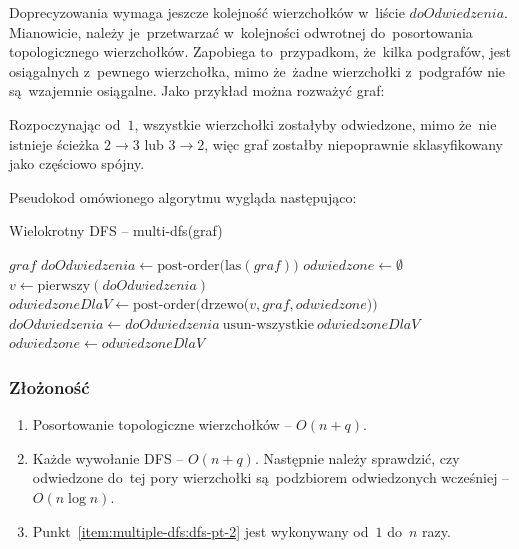 \documentclass[a4paper,12pt]{mwart}
\begin{document}
Doprecyzowania wymaga jeszcze kolejność wierzchołków w~liście $doOdwiedzenia$.
Mianowicie, należy je~przetwarzać w~kolejności odwrotnej do~posortowania
topologicznego wierzchołków. Zapobiega to~przypadkom, że~kilka podgrafów, jest
osiągalnych z~pewnego wierzchołka, mimo że~żadne wierzchołki z~podgrafów nie
są~wzajemnie osiągalne. Jako przykład można rozważyć graf:

\begin{figure}[H]
  \centering
\end{figure}

Rozpoczynając od~$1$, wszystkie wierzchołki zostałyby odwiedzone, mimo że~nie
istnieje ścieżka $2 \to 3$ lub $3 \to 2$, więc graf zostałby niepoprawnie
sklasyfikowany jako częściowo spójny.

Pseudokod omówionego algorytmu wygląda następująco:

\begin{algorithm}[H]
\caption{Wielokrotny DFS -- multi-dfs(graf)}
\begin{algorithmic}[1]
\Require $graf$
\State $doOdwiedzenia \gets \text{post-order(las}(graf))$
\State $odwiedzone \gets \emptyset$
\State $v \gets \text{pierwszy}(doOdwiedzenia)$
\State $odwiedzoneDlaV \gets \text{post-order(drzewo(} v, graf, odwiedzone))$
\State $doOdwiedzenia \gets doOdwiedzenia \ \text{usun-wszystkie} \ odwiedzoneDlaV$
\State $odwiedzone \gets odwiedzoneDlaV$
\Else
\State {}
\EndIf
\EndWhile
\State {}
\end{algorithmic}
\end{algorithm}

\subsubsection{Złożoność}

\begin{enumerate}
\item Posortowanie topologiczne wierzchołków -- $O(n + q)$.
\item\label{item:multiple-dfs:dfs-pt-2} Każde wywołanie DFS -- $O(n + q)$.
  Następnie należy sprawdzić, czy odwiedzone do~tej pory wierzchołki
  są~podzbiorem odwiedzonych wcześniej -- $O(n \log n)$.
\item Punkt~\ref{item:multiple-dfs:dfs-pt-2} jest wykonywany od~$1$ do~$n$ razy.
\end{enumerate}
\end{document}
